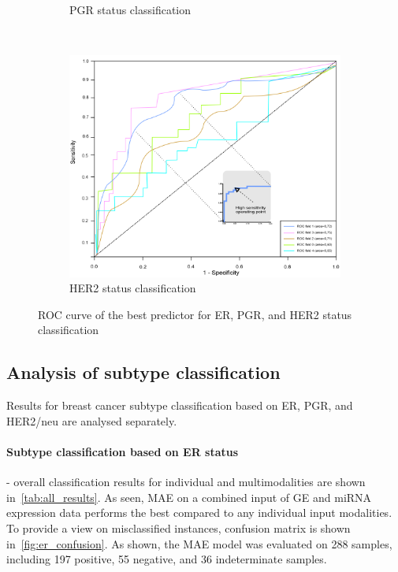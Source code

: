 \begin{figure}
\begin{subfigure}{.49\linewidth}
		\caption{PGR status classification}
        \label{fig:pgr_roc}
	\end{subfigure}\\[1ex]
	\begin{subfigure}{0.49\linewidth}
		\centering
		\includegraphics[width=0.9\linewidth]{images/roc_her2.png}
		\caption{HER2 status classification }
        \label{fig:her2_roc}
	\end{subfigure}
	\caption{ROC curve of the best predictor for ER, PGR, and HER2 status classification~\cite{karimACCESS2019}} 
	\label{fig:roc_all}
\end{figure}
\fi 

\subsection{Analysis of subtype classification}
Results for breast cancer subtype classification based on ER, PGR, and HER2/neu are analysed separately. 

\paragraph{Subtype classification based on ER status} - overall classification results for individual and multimodalities are shown in~\cref{tab:all_results}. As seen, MAE on a combined input of GE and miRNA expression data performs the best compared to any individual input modalities. To provide a view on misclassified instances, confusion matrix is shown in~\cref{fig:er_confusion}. As shown, the MAE model was evaluated on 288 samples, including 197 positive, 55 negative, and 36 indeterminate samples. 


